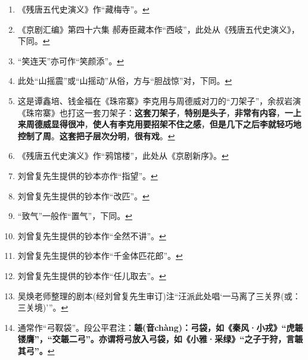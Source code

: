 \begin{enumerate}
  \protect\hyperlink{fnref394}{↩}
\item
  \leavevmode\hypertarget{fn395}{}%
  《残唐五代史演义》作``藏梅寺''。\protect\hyperlink{fnref395}{↩}
\item
  \leavevmode\hypertarget{fn396}{}%
  《京剧汇编》第四十六集
  郝寿臣藏本作``西岐''，此处从《残唐五代史演义》，下同。\protect\hyperlink{fnref396}{↩}
\item
  \leavevmode\hypertarget{fn397}{}%
  ``笑连天''亦可作``笑颜添''。\protect\hyperlink{fnref397}{↩}
\item
  \leavevmode\hypertarget{fn398}{}%
  此处``山摇震''或``山摇动''从俗，方与``胆战惊''对，下同。\protect\hyperlink{fnref398}{↩}
\item
  \leavevmode\hypertarget{fn399}{}%
  这是谭鑫培、钱金福在《珠帘寨》李克用与周德威对刀的``刀架子''，余叔岩演《珠帘寨》也打这一套刀架子：\textbf{这套刀架子}，\textbf{特别是头子}，\textbf{非常有内容}，\textbf{一上来周德威显得很冲}，\textbf{使人有李克用要招架不住之感}，\textbf{但是几下之后李就轻巧地控制了周}。\textbf{这套把子层次分明}，\textbf{很有戏}。\protect\hyperlink{fnref399}{↩}
\item
  \leavevmode\hypertarget{fn400}{}%
  《残唐五代史演义》作``鸦馆楼''，此处从《京剧新序》。\protect\hyperlink{fnref400}{↩}
\item
  \leavevmode\hypertarget{fn401}{}%
  刘曾复先生提供的钞本亦作``指望''。\protect\hyperlink{fnref401}{↩}
\item
  \leavevmode\hypertarget{fn402}{}%
  刘曾复先生提供的钞本作``改匹''。\protect\hyperlink{fnref402}{↩}
\item
  \leavevmode\hypertarget{fn403}{}%
  ``致气''一般作``置气''，下同。\protect\hyperlink{fnref403}{↩}
\item
  \leavevmode\hypertarget{fn404}{}%
  刘曾复先生提供的钞本作``全然不讲''。\protect\hyperlink{fnref404}{↩}
\item
  \leavevmode\hypertarget{fn405}{}%
  刘曾复先生提供的钞本作``千金体匹花郎''。\protect\hyperlink{fnref405}{↩}
\item
  \leavevmode\hypertarget{fn406}{}%
  刘曾复先生提供的钞本作``任儿取去''。\protect\hyperlink{fnref406}{↩}
\item
  \leavevmode\hypertarget{fn407}{}%
  吴焕老师整理的剧本(经刘曾复先生审订)注``汪派此处唱`一马离了三关界(或：三关境)'''。\protect\hyperlink{fnref407}{↩}
\item
  \leavevmode\hypertarget{fn408}{}%
  通常作``弓靫袋''。段公平君注：\textbf{韔(音chàng)：弓袋，如《秦风·小戎》``虎韔镂膺''，``交韔二弓''。亦谓将弓放入弓袋，如《小雅·采绿》``之子于狩，言韔其弓''。}\protect\hyperlink{fnref408}{↩}

\end{enumerate}
